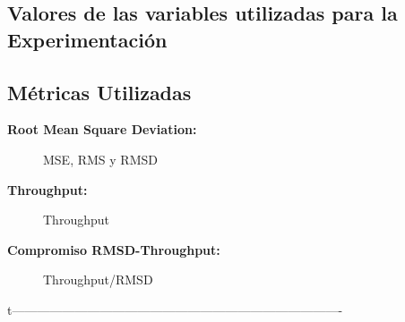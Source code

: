 \subsection{Valores de las variables utilizadas para la Experimentaci\'on}\label{sec:variables_metricas:variables}


\subsection{M\'etricas Utilizadas}\label{sec:variables_metricas:metricas}
\begin{description}
    \item[\textbf{Root Mean Square Deviation:}] MSE, RMS y RMSD

    \item[\textbf{Throughput:}] Throughput

    \item[\textbf{Compromiso RMSD-Throughput:}] Throughput/RMSD

\end{description}

t-------------------------------------------------------------------------------
